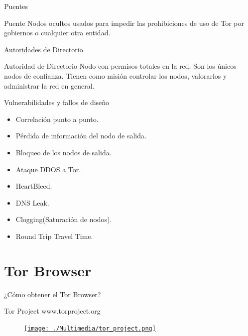 \documentclass[10pt]{beamer}
\begin{document}
\begin{frame}[fragile]{Puentes}
	\pause
	\begin{block}{Puente}
		Nodos ocultos usados para impedir las prohibiciones de uso de Tor por gobiernos o cualquier otra entidad.
	\end{block}
\end{frame}

\begin{frame}[fragile]{Autoridades de Directorio}
	\pause
	\begin{block}{Autoridad de Directorio}
		Nodo con permisos totales en la red. Son los únicos nodos de confianza. Tienen como misión controlar los nodos, valorarlos y administrar la red en general.
	\end{block}
\end{frame}

\begin{frame}[fragile]{Vulnerabilidades y fallos de diseño}
	\pause
	\begin{itemize}
		\item<1-> Correlación punto a punto.\pause
		\item<2-> Pérdida de información del nodo de salida.\pause
		\item<3-> Bloqueo de los nodos de salida.\pause
		\item<4-> Ataque DDOS a Tor.\pause
		\item<5-> HeartBleed.\pause
		\item<6-> DNS Leak.\pause
		\item<7-> Clogging(Saturación de nodos).\pause
		\item<8-> Round Trip Travel Time.\pause
	\end{itemize}
\end{frame}

\section{Tor Browser}

\begin{frame}{¿Cómo obtener el Tor Browser?}
	\pause
	\begin{block}{Tor Project}
		www.torproject.org
	\end{block}
	
	\begin{figure}
		\centering
		\href{http://www.torproject.org}{\texttt{[image: ./Multimedia/tor\_project.png]}}
	\end{figure}
\end{frame}
\end{document}
